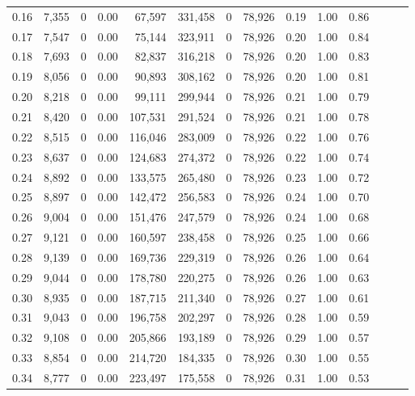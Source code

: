 \begin{tabular}{rrrrrrrrrrrrrr}
0.16 &  7,355 &      0 &  0.00 &   67,597 &  331,458 &       0 &  78,926 &  0.19 &  1.00 &      0.86 \\
0.17 &  7,547 &      0 &  0.00 &   75,144 &  323,911 &       0 &  78,926 &  0.20 &  1.00 &      0.84 \\
0.18 &  7,693 &      0 &  0.00 &   82,837 &  316,218 &       0 &  78,926 &  0.20 &  1.00 &      0.83 \\
0.19 &  8,056 &      0 &  0.00 &   90,893 &  308,162 &       0 &  78,926 &  0.20 &  1.00 &      0.81 \\
0.20 &  8,218 &      0 &  0.00 &   99,111 &  299,944 &       0 &  78,926 &  0.21 &  1.00 &      0.79 \\
0.21 &  8,420 &      0 &  0.00 &  107,531 &  291,524 &       0 &  78,926 &  0.21 &  1.00 &      0.78 \\
0.22 &  8,515 &      0 &  0.00 &  116,046 &  283,009 &       0 &  78,926 &  0.22 &  1.00 &      0.76 \\
0.23 &  8,637 &      0 &  0.00 &  124,683 &  274,372 &       0 &  78,926 &  0.22 &  1.00 &      0.74 \\
0.24 &  8,892 &      0 &  0.00 &  133,575 &  265,480 &       0 &  78,926 &  0.23 &  1.00 &      0.72 \\
0.25 &  8,897 &      0 &  0.00 &  142,472 &  256,583 &       0 &  78,926 &  0.24 &  1.00 &      0.70 \\
0.26 &  9,004 &      0 &  0.00 &  151,476 &  247,579 &       0 &  78,926 &  0.24 &  1.00 &      0.68 \\
0.27 &  9,121 &      0 &  0.00 &  160,597 &  238,458 &       0 &  78,926 &  0.25 &  1.00 &      0.66 \\
0.28 &  9,139 &      0 &  0.00 &  169,736 &  229,319 &       0 &  78,926 &  0.26 &  1.00 &      0.64 \\
0.29 &  9,044 &      0 &  0.00 &  178,780 &  220,275 &       0 &  78,926 &  0.26 &  1.00 &      0.63 \\
0.30 &  8,935 &      0 &  0.00 &  187,715 &  211,340 &       0 &  78,926 &  0.27 &  1.00 &      0.61 \\
0.31 &  9,043 &      0 &  0.00 &  196,758 &  202,297 &       0 &  78,926 &  0.28 &  1.00 &      0.59 \\
0.32 &  9,108 &      0 &  0.00 &  205,866 &  193,189 &       0 &  78,926 &  0.29 &  1.00 &      0.57 \\
0.33 &  8,854 &      0 &  0.00 &  214,720 &  184,335 &       0 &  78,926 &  0.30 &  1.00 &      0.55 \\
0.34 &  8,777 &      0 &  0.00 &  223,497 &  175,558 &       0 &  78,926 &  0.31 &  1.00 &      0.53 \\

\end{tabular}
